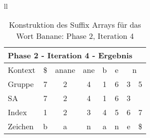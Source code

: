 \begin{table}[H]
\begin{adjustbox}{max width=\textwidth}
\begin{tabular}{ll}
\begin{tabular}{lccccccc}
\multicolumn{8}{l}{Phase 2 - Iteration 4 - Ergebnis}                                                                                                                                     \\ \hline
\multicolumn{1}{l|}{Kontext} & \multicolumn{1}{c|}{\$} & \multicolumn{1}{c|}{anane} & \multicolumn{1}{c|}{ane} & \multicolumn{1}{c|}{b} & \multicolumn{1}{c|}{e} & \multicolumn{2}{c}{n} \\
\multicolumn{1}{l|}{Gruppe}  & \multicolumn{1}{c|}{7}  & \multicolumn{1}{c|}{2}     & \multicolumn{1}{c|}{4}   & \multicolumn{1}{c|}{1} & \multicolumn{1}{c|}{6} & 3         & 5          \\ 
\multicolumn{1}{l|}{SA}      & \multicolumn{1}{c|}{7}  & \multicolumn{1}{c|}{2}     & \multicolumn{1}{c|}{4}   & \multicolumn{1}{c|}{1} & \multicolumn{1}{c|}{6} & 3         &            \\ \hline
\multicolumn{1}{l|}{Index}   & 1                       & 2                          & 3                        & 4                      & 5                      & 6         & 7          \\
\multicolumn{1}{l|}{Zeichen} & b                       & a                          & n                        & a                      & n                      & e         & \$        
\end{tabular}

\end{tabular}
\end{adjustbox}

\caption[Konstruktion des Suffix Arrays f{\"u}r das Wort Banane: Phase 2, Iteration 4]{Konstruktion des Suffix Arrays f{\"u}r das Wort Banane: Phase 2, Iteration 4}
\label{fig_banane_2_4} 
\end{table}
